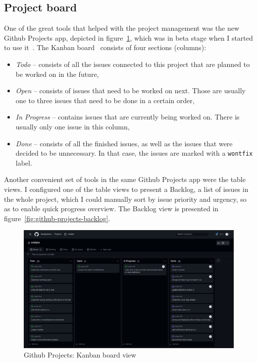 \subsection{Project board}\label{sec:project-board}

One of the great tools that helped with the project management
was the new Github Projects app,
depicted in figure~\ref{fig:github-projects-kanban},
which was in beta stage
when I started to use it~\cite{github_inc_github_2022}.
The Kanban board~\cite{goddard_kanban_2022} consists of four sections (columns):

\begin{itemize}
      \item
            \textit{Todo} -- consists of all the issues
            connected to this project
            that are planned to be worked on in the future,
      \item
            \textit{Open} -- consists of issues
            that need to be worked on next.
            Those are usually one to three issues
            that need to be done in a certain order,
      \item
            \textit{In Progress} -- contains issues
            that are currently being worked on.
            There is usually only one issue in this column,
      \item
            \textit{Done} -- consists of all the finished issues,
            as well as the issues that were decided to be unnecessary.
            In that case, the issues are marked with a \texttt{wontfix} label.
\end{itemize}

Another convenient set of tools in the same Github Projects app
were the table views.
I configured one of the table views to present a Backlog,
a list of issues in the whole project,
which I could manually sort by
issue priority and urgency,
so as to enable quick progress overview.
The Backlog view is presented in figure~\ref{fig:github-projects-backlog}.

\begin{figure}[h]
      \centering
      \includegraphics[width=\linewidth,keepaspectratio]{img/kanban_board.jpg}
      \caption{Github Projects: Kanban board view}
      \label{fig:github-projects-kanban}
\end{figure}

